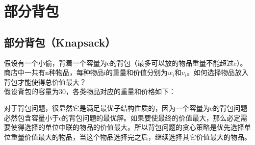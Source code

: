 \newpage

\section{部分背包}

\subsection{部分背包（Knapsack）}

假设有一个小偷，背着一个容量为c的背包（最多可以放的物品重量不能超过c）。商店中一共有n种物品，每种物品i的重量和价值分别为$ w_i $和$ v_i $。如何选择物品放入背包才能使得总价值最大？\\

假设背包的容量为30，各类物品对应的重量和价格如下：

\begin{table}[H]
	\centering
	\caption{物品信息}
\end{table}

对于背包问题，很显然它是满足最优子结构性质的，因为一个容量为c的背包问题必然包含容量小于c的背包问题的最优解。如果要使最终的价值最大，那么必定需要使得选择的单位中联的物品的价值最大。所以背包问题的贪心策略是优先选择单位重量价值最大的物品，当这个物品选择完之后，继续选择其它价值最大的物品。\\



